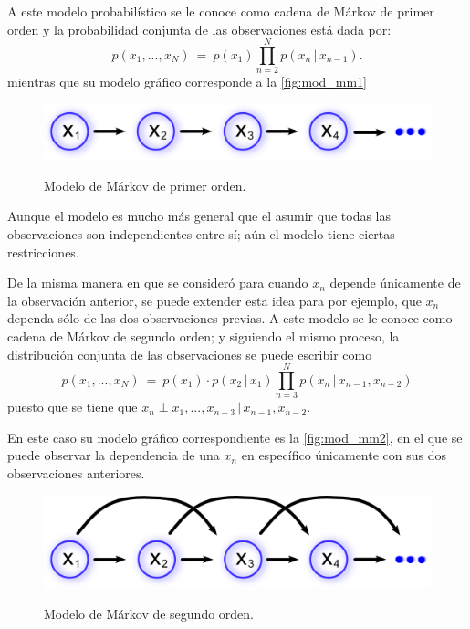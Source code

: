 A este modelo probabilístico se le conoce como cadena de Márkov de primer orden y la probabilidad conjunta de las observaciones está dada por:
\begin{equation}
\label{eqn:2-4}
p(x_1, ..., x_N) ~=~ p(x_1) \prod_{n=2}^N p(x_n \,|\, x_{n-1}).
\end{equation}
mientras que su modelo gráfico corresponde a la \autoref{fig:mod_mm1}
\begin{figure}[bt]
        \myfloatalign
        {\includegraphics[width=0.6\linewidth]{gfx/chap2/mod-mm1}}
        \caption{Modelo de Márkov de primer orden.}
        \label{fig:mod_mm1}
\end{figure}

Aunque el modelo es mucho más general que el asumir que todas las observaciones son independientes entre sí; aún el modelo tiene ciertas restricciones. 

De la misma manera en que se consideró para cuando $x_n$ depende únicamente de la observación anterior, se puede extender esta idea para por ejemplo, que $x_n$ dependa sólo de las dos observaciones previas. A este modelo se le conoce como cadena de Márkov de segundo orden; y siguiendo el mismo proceso, la distribución conjunta de las observaciones se puede escribir como 
\begin{equation}
\label{eqn:2-5}
p(x_1, ..., x_N) ~=~ p(x_1) \cdot p(x_2 \,|\, x_1) 
        \prod_{n=3}^N p(x_n \,|\, x_{n-1}, x_{n-2})
\end{equation}
puesto que se tiene que $x_n \perp x_1, ..., x_{n-3} \,|\, x_{n-1}, x_{n-2}$.

En este caso su modelo gráfico correspondiente es la \autoref{fig:mod_mm2}, en el que se puede observar la dependencia de una $x_n$ en específico únicamente con sus dos observaciones anteriores.

\begin{figure}[bt]
        \myfloatalign
        {\includegraphics[width=0.6\linewidth]{gfx/chap2/mod-mm2}}
        \caption{Modelo de Márkov de segundo orden.}
        \label{fig:mod_mm2}
\end{figure}

